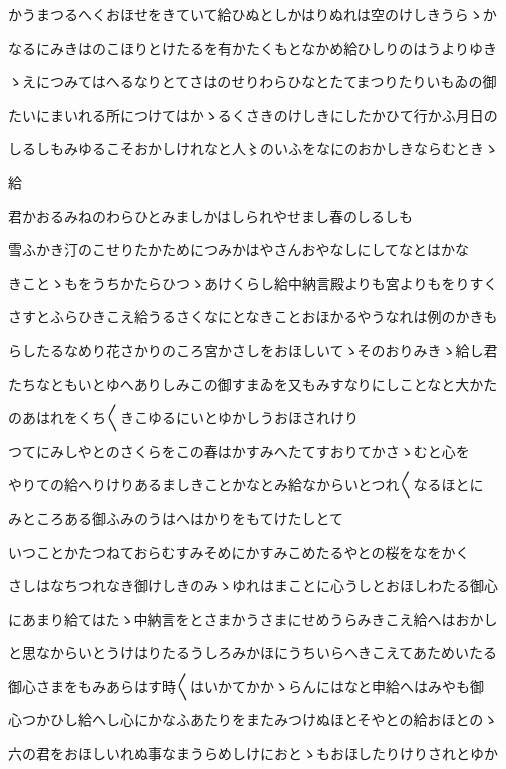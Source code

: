 \documentclass[a4paper,11pt,landscape]{ltjtarticle}
\begin{document}
かうまつるへくおほせをきていて給ひぬとしかはりぬれは空のけしきうらゝか
\par\medskip
なるにみきはのこほりとけたるを有かたくもとなかめ給ひしりのはうよりゆき
\par\medskip
ゝえにつみてはへるなりとてさはのせりわらひなとたてまつりたりいもゐの御
\par\medskip
たいにまいれる所につけてはかゝるくさきのけしきにしたかひて行かふ月日の
\par\medskip
しるしもみゆるこそおかしけれなと人〻のいふをなにのおかしきならむときゝ
\par\medskip
給
\par\medskip
君かおるみねのわらひとみましかはしられやせまし春のしるしも
\par\medskip
雪ふかき汀のこせりたかためにつみかはやさんおやなしにしてなとはかな
\par\medskip
きことゝもをうちかたらひつゝあけくらし給中納言殿よりも宮よりもをりすく
\par\medskip
さすとふらひきこえ給うるさくなにとなきことおほかるやうなれは例のかきも
\par\medskip
らしたるなめり花さかりのころ宮かさしをおほしいてゝそのおりみきゝ給し君
\par\medskip
たちなともいとゆへありしみこの御すまゐを又もみすなりにしことなと大かた
\par\medskip
のあはれをくち〱きこゆるにいとゆかしうおほされけり
\par\medskip
つてにみしやとのさくらをこの春はかすみへたてすおりてかさゝむと心を
\par\medskip
やりての給へりけりあるましきことかなとみ給なからいとつれ〱なるほとに
\par\medskip
みところある御ふみのうはへはかりをもてけたしとて
\par\medskip
いつことかたつねておらむすみそめにかすみこめたるやとの桜をなをかく
\par\medskip
さしはなちつれなき御けしきのみゝゆれはまことに心うしとおほしわたる御心
\par\medskip
にあまり給てはたゝ中納言をとさまかうさまにせめうらみきこえ給へはおかし
\par\medskip
と思なからいとうけはりたるうしろみかほにうちいらへきこえてあためいたる
\par\medskip
御心さまをもみあらはす時〱はいかてかかゝらんにはなと申給へはみやも御
\par\medskip
心つかひし給へし心にかなふあたりをまたみつけぬほとそやとの給おほとのゝ
\par\medskip
六の君をおほしいれぬ事なまうらめしけにおとゝもおほしたりけりされとゆか
\end{document}
